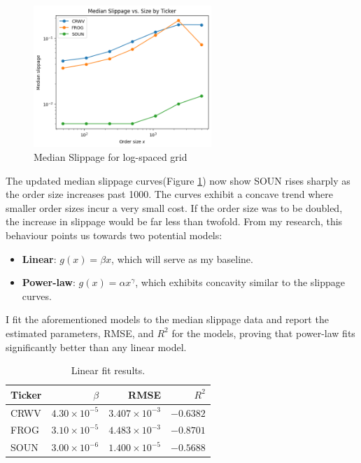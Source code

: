 \documentclass[12pt, letterpaper]{article}
\begin{document}
\begin{figure}[h!] %
    \centering
    \includegraphics[width=0.6\textwidth]{res/images/median_slippage_med_grid.png} %
    \caption{Median Slippage for log-spaced grid}
    \label{fig:slippage_log_grid} 
\end{figure}


The updated median slippage curves(Figure \ref{fig:slippage_log_grid}) now show SOUN rises sharply as the order size increases past 1000. The curves exhibit a concave trend where smaller order sizes incur a very small cost. If the order size was to be doubled, the increase in slippage would be far less than twofold. From my research, this behaviour points us towards two potential models:
\begin{itemize}
    \item \textbf{Linear}: $g(x) = \beta x$, which will serve as my baseline.
    \item \textbf{Power-law}: $g(x) = \alpha x^\gamma$, which exhibits concavity similar to the slippage curves.
\end{itemize}



I fit the aforementioned models to the median slippage data and report the estimated parameters, RMSE, and $R^2$ for the models, proving that power-law fits significantly better than any linear model.

\begin{table}[ht]
\centering
\begin{tabular}{lrrr} 
\toprule
Ticker & $\beta$ & RMSE & $R^2$ \\
\midrule 
CRWV  & $4.30\times10^{-5}$ & $3.407\times10^{-3}$ & $-0.6382$ \\
FROG  & $3.10\times10^{-5}$ & $4.483\times10^{-3}$ & $-0.8701$ \\
SOUN  & $3.00\times10^{-6}$ & $1.400\times10^{-5}$ & $-0.5688$ \\
\bottomrule
\end{tabular}
\caption{Linear fit results.}
\end{table}
\end{document}
